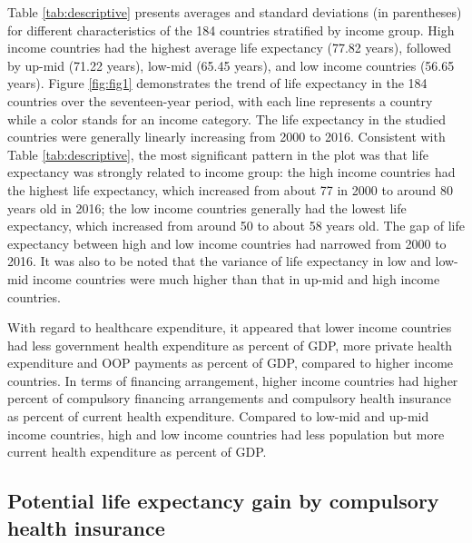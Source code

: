 \documentclass[]{elsarticle} %
\begin{document}
Table \ref{tab:descriptive} presents averages and standard deviations (in parentheses) for different characteristics of the 184 countries stratified by income group. High income countries had the highest average life expectancy (77.82 years), followed by up-mid (71.22 years), low-mid (65.45 years), and low income countries (56.65 years). Figure \ref{fig:fig1} demonstrates the trend of life expectancy in the 184 countries over the seventeen-year period, with each line represents a country while a color stands for an income category. The life expectancy in the studied countries were generally linearly increasing from 2000 to 2016. Consistent with Table \ref{tab:descriptive}, the most significant pattern in the plot was that life expectancy was strongly related to income group: the high income countries had the highest life expectancy, which increased from about 77 in 2000 to around 80 years old in 2016; the low income countries generally had the lowest life expectancy, which increased from around 50 to about 58 years old. The gap of life expectancy between high and low income countries had narrowed from 2000 to 2016. It was also to be noted that the variance of life expectancy in low and low-mid income countries were much higher than that in up-mid and high income countries.

With regard to healthcare expenditure, it appeared that lower income countries had less government health expenditure as percent of GDP, more private health expenditure and OOP payments as percent of GDP, compared to higher income countries. In terms of financing arrangement, higher income countries had higher percent of compulsory financing arrangements and compulsory health insurance as percent of current health expenditure. Compared to low-mid and up-mid income countries, high and low income countries had less population but more current health expenditure as percent of GDP.

\hypertarget{potential-life-expectancy-gain-by-compulsory-health-insurance}{%
\subsection{Potential life expectancy gain by compulsory health insurance}\label{potential-life-expectancy-gain-by-compulsory-health-insurance}}
\end{document}
